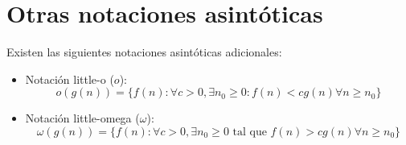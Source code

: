 \documentclass{article}
\theoremstyle{definition}
\theoremstyle{plain}
\theoremstyle{remark}
\begin{document}
\section{Otras notaciones asintóticas}

Existen las siguientes notaciones asintóticas adicionales:
\begin{itemize}
  \item Notación little-o ($o$): 
    \[
    o(g(n)) = \{ f(n) : \forall c > 0, \exists n_0 \geq 0 : f(n) < c g(n) \forall n \geq n_0 \}
    \]
  \item Notación little-omega ($\omega$):
    \[
    \omega(g(n)) = \{ f(n) : \forall c > 0, \exists n_0 \geq 0 \text{ tal que } f(n) > c g(n) \forall n \geq n_0 \}
    \]
\end{itemize}
\end{document}
